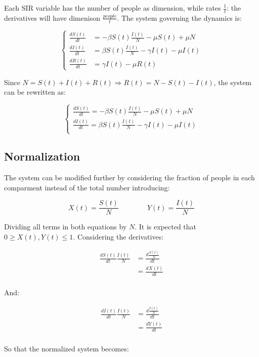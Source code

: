 Each SIR variable has the number of people as dimension, while rates $\frac{1}{t}$: the derivatives will have dimenison $\frac{people}{t}$.
The system governing the dynamics is:

$$\begin{cases}
  \frac{dS(t)}{dt} &= -\beta S(t)\frac{I(t)}{N} - \mu S(t) + \mu N\\
  \frac{dI(t)}{dt} &= \beta S(t)\frac{I(t)}{N} - \gamma I(t) - \mu I(t)\\
  \frac{dR(t)}{dt} &= \gamma I(t) - \mu R(t)
\end{cases}$$

Since $N = S(t) + I(t) + R(t)\Rightarrow R(t) = N - S(t) - I(t)$, the system can be rewritten as:

$$\begin{cases}
  \frac{dS(t)}{dt} = -\beta S(t) \frac{I(t)}{N} - \mu S(t) + \mu N\\
  \frac{dI(t)}{dt} = \beta S(t)\frac{I(t)}{N} - \gamma I(t) - \mu I(t)\\
\end{cases}$$

  \subsection{Normalization}
  The system can be modified further by considering the fraction of people in each comparment instead of the total number introducing:

  $$X(t) = \frac{S(t)}{N}\qquad\qquad Y(t) = \frac{I(t)}{N}$$

  Dividing all terms in both equations by $N$.
  It is expected that $0\ge X(t),Y(t)\le 1$.
  Considering the derivatives:

  \begin{align*}
    \frac{dS(t)}{dt}\frac{I(t)}{N} &= \frac{d\frac{S(t)}{N}}{dt}\\
                                 &= \frac{dX(t)}{dt}\\
  \end{align*}

  And:

  \begin{align*}
    \frac{dI(t)}{dt}\frac{I(t)}{N} &= \frac{d\frac{I(t)}{N}}{dt}\\
                                 &= \frac{dY(t)}{dt}\\
  \end{align*}

  So that the normalized system becomes:

